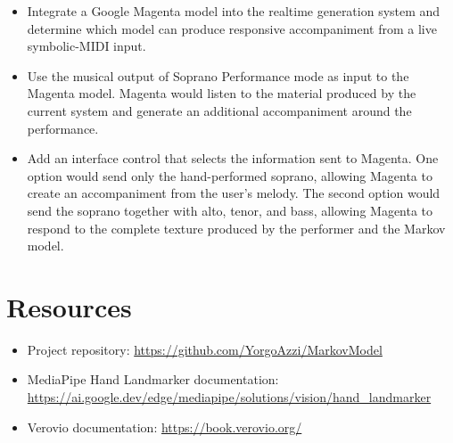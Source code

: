 \documentclass[11pt,a4paper]{article}
\begin{document}
\begin{itemize}
    \item Integrate a Google Magenta model into the realtime generation system
    and determine which model can produce responsive accompaniment from a live
    symbolic-MIDI input.
    \item Use the musical output of Soprano Performance mode as input to the
    Magenta model. Magenta would listen to the material produced by the current
    system and generate an additional accompaniment around the performance.
    \item Add an interface control that selects the information sent to
    Magenta. One option would send only the hand-performed soprano, allowing
    Magenta to create an accompaniment from the user's melody. The second
    option would send the soprano together with alto, tenor, and bass, allowing
    Magenta to respond to the complete texture produced by the performer and
    the Markov model.
\end{itemize}

\section{Resources}

\begin{itemize}
    \item Project repository:
    \url{https://github.com/YorgoAzzi/MarkovModel}
    \item MediaPipe Hand Landmarker documentation:
    \url{https://ai.google.dev/edge/mediapipe/solutions/vision/hand_landmarker}
    \item Verovio documentation:
    \url{https://book.verovio.org/}
\end{itemize}
\end{document}
